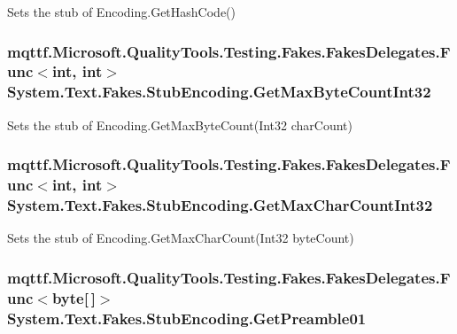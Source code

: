 Sets the stub of Encoding.\-Get\-Hash\-Code()

\hypertarget{class_system_1_1_text_1_1_fakes_1_1_stub_encoding_ada66696a8a62921b104bbfd9d83a00a7}{
\subsubsection[{Get\-Max\-Byte\-Count\-Int32}]{\setlength{\rightskip}{0pt plus 5cm}mqttf.\-Microsoft.\-Quality\-Tools.\-Testing.\-Fakes.\-Fakes\-Delegates.\-Func$<$int, int$>$ System.\-Text.\-Fakes.\-Stub\-Encoding.\-Get\-Max\-Byte\-Count\-Int32}}\label{class_system_1_1_text_1_1_fakes_1_1_stub_encoding_ada66696a8a62921b104bbfd9d83a00a7}


Sets the stub of Encoding.\-Get\-Max\-Byte\-Count(\-Int32 char\-Count)

\hypertarget{class_system_1_1_text_1_1_fakes_1_1_stub_encoding_a3da76ffaecb1a5a18fe3c08d8bf9ca01}{
\subsubsection[{Get\-Max\-Char\-Count\-Int32}]{\setlength{\rightskip}{0pt plus 5cm}mqttf.\-Microsoft.\-Quality\-Tools.\-Testing.\-Fakes.\-Fakes\-Delegates.\-Func$<$int, int$>$ System.\-Text.\-Fakes.\-Stub\-Encoding.\-Get\-Max\-Char\-Count\-Int32}}\label{class_system_1_1_text_1_1_fakes_1_1_stub_encoding_a3da76ffaecb1a5a18fe3c08d8bf9ca01}


Sets the stub of Encoding.\-Get\-Max\-Char\-Count(\-Int32 byte\-Count)

\hypertarget{class_system_1_1_text_1_1_fakes_1_1_stub_encoding_abf888af73ec6697c5e216671d40cdae1}{
\subsubsection[{Get\-Preamble01}]{\setlength{\rightskip}{0pt plus 5cm}mqttf.\-Microsoft.\-Quality\-Tools.\-Testing.\-Fakes.\-Fakes\-Delegates.\-Func$<$byte\mbox{[}$\,$\mbox{]}$>$ System.\-Text.\-Fakes.\-Stub\-Encoding.\-Get\-Preamble01}}\label{class_system_1_1_text_1_1_fakes_1_1_stub_encoding_abf888af73ec6697c5e216671d40cdae1}


